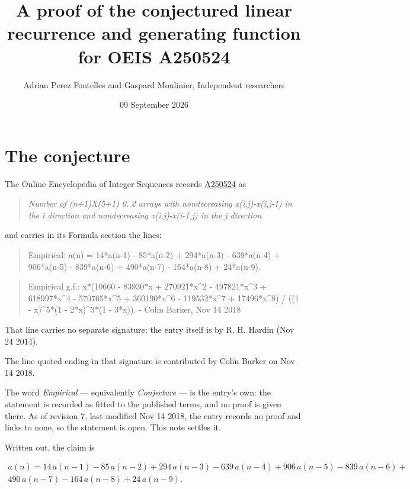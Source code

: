 \documentclass[11pt]{article}
\title{A proof of the conjectured linear recurrence and generating function for OEIS A250524}
\author{Adrian Perez Fontelles and Gaspard Moulinier, Independent researchers}
\date{09 September 2026}
\theoremstyle{definition}
\begin{document}
\maketitle
\section{The conjecture}

The Online Encyclopedia of Integer Sequences records \href{https://oeis.org/A250524}{A250524} as

\begin{quote}\itshape Number of (n+1)X(5+1) 0..2 arrays with nondecreasing x(i,j)-x(i,j-1) in the i direction and nondecreasing x(i,j)-x(i-1,j) in the j direction\end{quote}

and carries in its Formula section the lines:

\begin{quote}\ttfamily Empirical: a(n) = 14*a(n-1) - 85*a(n-2) + 294*a(n-3) - 639*a(n-4) + 906*a(n-5) - 839*a(n-6) + 490*a(n-7) - 164*a(n-8) + 24*a(n-9).\end{quote}

\begin{quote}\ttfamily Empirical g.f.: x*(10660 - 83930*x + 270921*x\textasciicircum{}2 - 497821*x\textasciicircum{}3 + 618997*x\textasciicircum{}4 - 570765*x\textasciicircum{}5 + 360190*x\textasciicircum{}6 - 119532*x\textasciicircum{}7 + 17496*x\textasciicircum{}8) / ((1 - x)\textasciicircum{}5*(1 - 2*x)\textasciicircum{}3*(1 - 3*x)). - Colin Barker, Nov 14 2018\end{quote}

That line carries no separate signature; the entry itself is by R. H. Hardin (Nov 24 2014).

The line quoted ending in that signature is contributed by Colin Barker on Nov 14 2018.

The word {\itshape Empirical} --- equivalently {\itshape Conjecture} --- is the entry's own: the statement is recorded as fitted to the published terms, and no proof is given there. As of revision 7, last modified Nov 14 2018, the entry records no proof and links to none, so the statement is open. This note settles it.

Written out, the claim is

\begin{multline*} a(n) = 14\,a(n-1) - 85\,a(n-2) + 294\,a(n-3) - 639\,a(n-4) + 906\,a(n-5) - 839\,a(n-6) + \\ 490\,a(n-7) - 164\,a(n-8) + 24\,a(n-9). \end{multline*}
\end{document}
